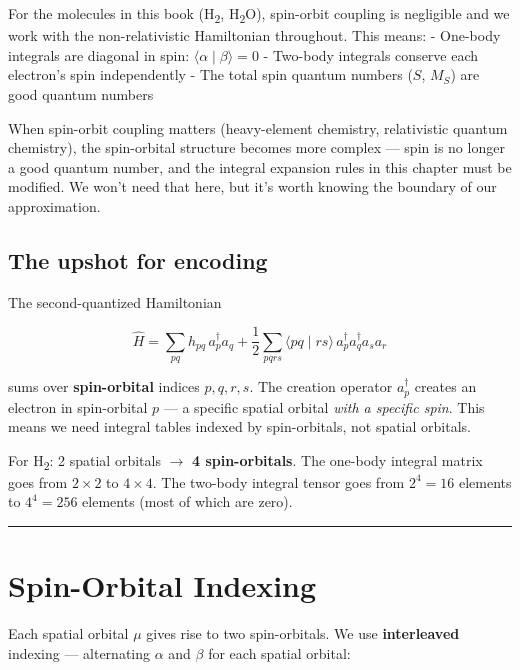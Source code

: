 \documentclass[
  11pt,
  oneside]{book}
\begin{document}
For the molecules in this book (H\textsubscript{2}, H\textsubscript{2}O), spin-orbit coupling is
negligible and we work with the non-relativistic Hamiltonian throughout.
This means: - One-body integrals are diagonal in spin:
\(\langle \alpha \mid \beta \rangle = 0\) - Two-body integrals conserve
each electron's spin independently - The total spin quantum numbers
(\(S\), \(M_S\)) are good quantum numbers

When spin-orbit coupling matters (heavy-element chemistry, relativistic
quantum chemistry), the spin-orbital structure becomes more complex ---
spin is no longer a good quantum number, and the integral expansion
rules in this chapter must be modified. We won't need that here, but
it's worth knowing the boundary of our approximation.

\subsection{The upshot for encoding}\label{the-upshot-for-encoding}

The second-quantized Hamiltonian

\[\hat{H} = \sum_{pq} h_{pq}\, a_p^\dagger a_q + \frac{1}{2}\sum_{pqrs} \langle pq \mid rs\rangle\, a_p^\dagger a_q^\dagger a_s a_r\]

sums over \textbf{spin-orbital} indices \(p, q, r, s\). The creation
operator \(a_p^\dagger\) creates an electron in spin-orbital \(p\) --- a
specific spatial orbital \emph{with a specific spin}. This means we need
integral tables indexed by spin-orbitals, not spatial orbitals.

For H\textsubscript{2}: 2 spatial orbitals $\rightarrow$ \textbf{4 spin-orbitals}. The one-body
integral matrix goes from \(2 \times 2\) to \(4 \times 4\). The two-body
integral tensor goes from \(2^4 = 16\) elements to \(4^4 = 256\)
elements (most of which are zero).

\begin{center}\rule{0.5\linewidth}{0.5pt}\end{center}

\section{Spin-Orbital Indexing}\label{spin-orbital-indexing}

Each spatial orbital \(\mu\) gives rise to two spin-orbitals. We use
\textbf{interleaved} indexing --- alternating \(\alpha\) and \(\beta\)
for each spatial orbital:
\end{document}
